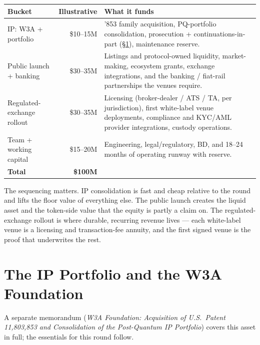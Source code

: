 \documentclass[11pt,a4paper]{article}
\begin{document}
\begin{table}[h]
\centering
\small
\begin{tabularx}{\textwidth}{@{}lrX@{}}
\toprule
\textbf{Bucket} & \textbf{Illustrative} & \textbf{What it funds}\\
\midrule
IP: W3A + portfolio        & \$10--15M & '853 family acquisition, PQ-portfolio consolidation, prosecution + continuations-in-part (\S\ref{sec:ip}), maintenance reserve.\\
Public launch + banking    & \$30--35M & Listings and protocol-owned liquidity, market-making, ecosystem grants, exchange integrations, and the banking / fiat-rail partnerships the venues require.\\
Regulated-exchange rollout & \$30--35M & Licensing (broker-dealer / ATS / TA, per jurisdiction), first white-label venue deployments, compliance and KYC/AML provider integrations, custody operations.\\
Team + working capital     & \$15--20M & Engineering, legal/regulatory, BD, and 18--24 months of operating runway with reserve.\\
\midrule
\textbf{Total}             & \textbf{\$100M} & \\
\bottomrule
\end{tabularx}
\end{table}

The sequencing matters. IP consolidation is fast and cheap relative to the
round and lifts the floor value of everything else. The public launch
creates the liquid asset and the token-side value that the equity is
partly a claim on. The regulated-exchange rollout is where durable,
recurring revenue lives --- each white-label venue is a licensing and
transaction-fee annuity, and the first signed venue is the proof that
underwrites the rest.

\section{The IP Portfolio and the W3A Foundation}
\label{sec:ip}

A separate memorandum (\emph{W3A Foundation: Acquisition of U.S.\ Patent
11,803,853 and Consolidation of the Post-Quantum IP Portfolio}) covers this
asset in full; the essentials for this round follow.
\end{document}
